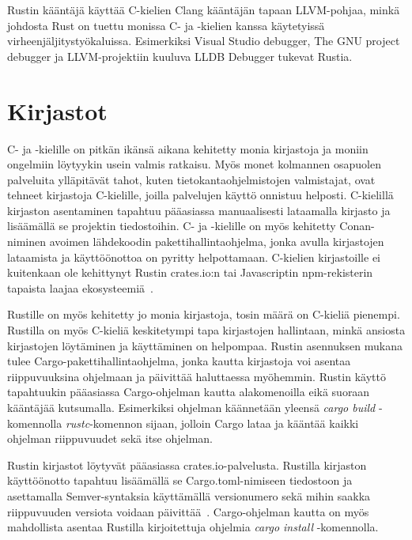 Rustin kääntäjä käyttää C-kielien Clang kääntäjän tapaan LLVM-pohjaa, minkä johdosta Rust on tuettu monissa C- ja \Cpp-kielien kanssa käytetyissä virheenjäljitystyökaluissa. Esimerkiksi Visual Studio debugger, The GNU project debugger ja LLVM-projektiin kuuluva LLDB Debugger tukevat Rustia.

\section{Kirjastot} \label{kirjastot}
C- ja \Cpp-kielille on pitkän ikänsä aikana kehitetty monia kirjastoja ja moniin ongelmiin löytyykin usein valmis ratkaisu. Myös monet kolmannen osapuolen palveluita ylläpitävät tahot, kuten tietokantaohjelmistojen valmistajat, ovat tehneet kirjastoja C-kielille, joilla palvelujen käyttö onnistuu helposti. C-kielillä kirjaston asentaminen tapahtuu pääasiassa manuaalisesti lataamalla kirjasto ja lisäämällä se projektin tiedostoihin. C- ja \Cpp-kielille on myös kehitetty Conan-niminen avoimen lähdekoodin pakettihallintaohjelma, jonka avulla kirjastojen lataamista ja käyttöönottoa on pyritty helpottamaan. C-kielien kirjastoille ei kuitenkaan ole kehittynyt Rustin crates.io:n tai Javascriptin npm-rekisterin tapaista laajaa ekosysteemiä~\cite{WOS:000449166500015}.

Rustille on myös kehitetty jo monia kirjastoja, tosin määrä on C-kieliä pienempi. Rustilla on myös C-kieliä keskitetympi tapa kirjastojen hallintaan, minkä ansiosta kirjastojen löytäminen ja käyttäminen on helpompaa. Rustin asennuksen mukana tulee Cargo-pakettihallintaohjelma, jonka kautta kirjastoja voi asentaa riippuvuuksina ohjelmaan ja päivittää haluttaessa myöhemmin. Rustin käyttö tapahtuukin pääasiassa Cargo-ohjelman kautta alakomenoilla eikä suoraan kääntäjää kutsumalla. Esimerkiksi ohjelman käännetään yleensä \textit{cargo build} -komennolla \textit{rustc}-komennon sijaan, jolloin Cargo lataa ja kääntää kaikki ohjelman riippuvuudet sekä itse ohjelman. 

Rustin kirjastot löytyvät pääasiassa crates.io-palvelusta. Rustilla kirjaston käyttöönotto tapahtuu lisäämällä se Cargo.toml-nimiseen tiedostoon ja asettamalla Semver-syntaksia käyttämällä versionumero sekä mihin saakka riippuvuuden versiota voidaan päivittää~\cite{cargo}. Cargo-ohjelman kautta on myös mahdollista asentaa Rustilla kirjoitettuja ohjelmia \textit{cargo install} -komennolla. 